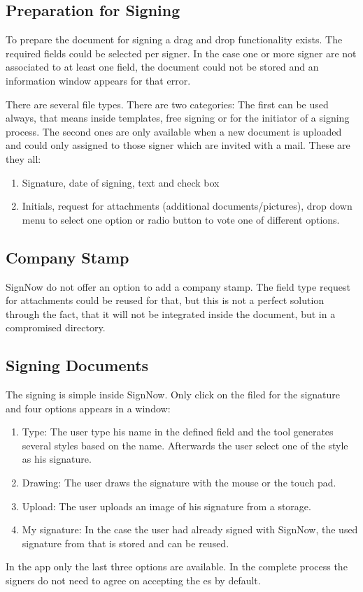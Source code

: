 \subsection{Preparation for Signing}
To prepare the document for signing a drag and drop functionality exists. The required fields could be selected per signer. In the case one or more signer are not associated to at least one field, the document could not be stored and an information window appears for that error.

There are several file types. There are two categories: The first can be used always, that means inside templates, free signing or for the initiator of a signing process. The second ones are only available when a new document is uploaded and could only assigned to those signer which are invited with a mail. These are they all:
\begin{enumerate}
	\item Signature, date of signing, text and check box
	\item Initials, request for attachments (additional documents/pictures), drop down menu to select one option or radio button to vote one of different options.
\end{enumerate}

\subsection{Company Stamp}
SignNow do not offer an option to add a company stamp. The field type request for attachments could be reused for that, but this is not a perfect solution through the fact, that it will not be integrated inside the document, but in a compromised directory.

\subsection{Signing Documents}
The signing is simple inside SignNow. Only click on the filed for the signature and four options appears in a window:
\begin{enumerate}
	\item Type: The user type his name in the defined field and the tool generates several styles based on the name. Afterwards the user select one of the style as his signature.
	\item Drawing: The user draws the signature with the mouse or the touch pad.
	\item Upload: The user uploads an image of his signature from a storage.
	\item My signature: In the case the user had already signed with SignNow, the used signature from that is stored and can be reused.
\end{enumerate}
In the \gls{app} only the last three options are available. In the complete process the signers do not need to agree on accepting the \gls{es} by default.

